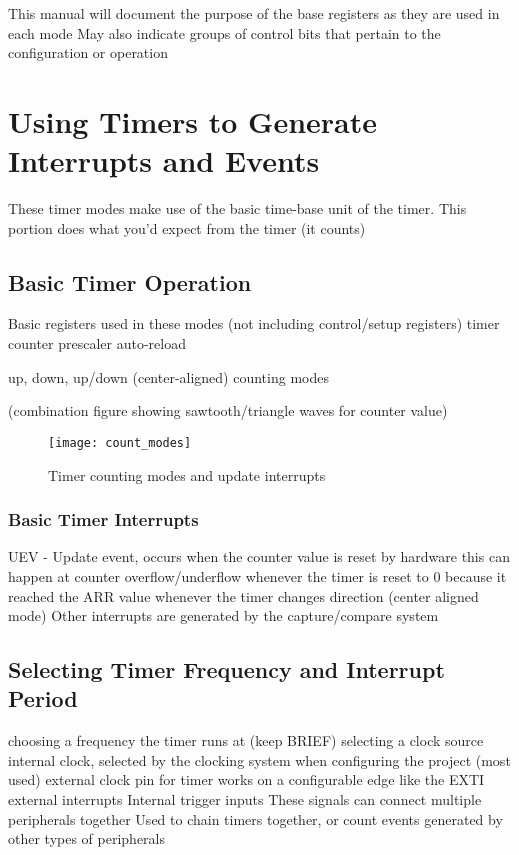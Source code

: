 \documentclass[11pt,fleqn]{book} %
\begin{document}
    This manual will document the purpose of the base registers as they are used in each mode
        May also indicate groups of control bits that pertain to the configuration or operation 	

\section{Using Timers to Generate Interrupts and Events}
    These timer modes make use of the basic time-base unit of the timer. 
    This portion does what you'd expect from the timer (it counts)
    
    \subsection{Basic Timer Operation}
    
    Basic registers used in these modes (not including control/setup registers)
        timer counter
        prescaler 
        auto-reload
    
    up, down, up/down (center-aligned) counting modes
    
    (combination figure showing sawtooth/triangle waves for counter value)
    \begin{figure}[]
        \centering\texttt{[image: count\_modes]}
        \caption{Timer counting modes and update interrupts}
        \label{count_modes}
    \end{figure}
    
    \subsubsection{Basic Timer Interrupts}
    UEV - Update event, occurs when the counter value is reset by hardware
        this can happen at counter overflow/underflow
        whenever the timer is reset to 0 because it reached the ARR value
        whenever the timer changes direction (center aligned mode)
    Other interrupts are generated by the capture/compare system
    
    \subsection{Selecting Timer Frequency and Interrupt Period}	
    choosing a frequency the timer runs at (keep BRIEF)
    selecting a clock source
        internal clock, selected by the clocking system when configuring the project (most used)
        external clock pin for timer
            works on a configurable edge like the EXTI external interrupts
        Internal trigger inputs
            These signals can connect multiple peripherals together
            Used to chain timers together, or count events generated by other types of peripherals
    
\end{document}
